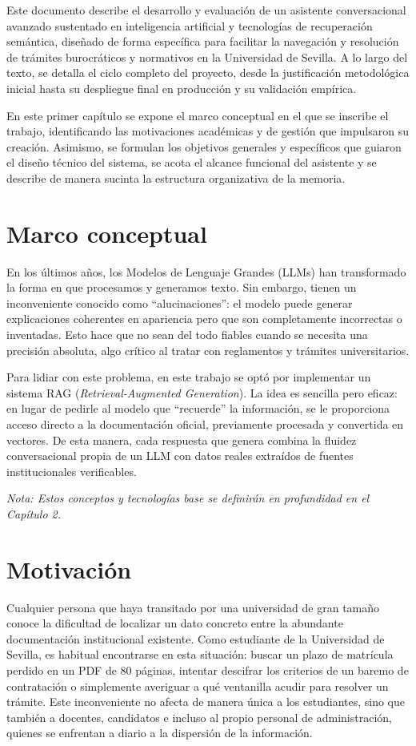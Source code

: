 \documentclass[12pt,a4paper,oneside]{report}
\begin{document}
Este documento describe el desarrollo y evaluación de un asistente conversacional avanzado sustentado en inteligencia artificial y tecnologías de recuperación semántica, diseñado de forma específica para facilitar la navegación y resolución de trámites burocráticos y normativos en la Universidad de Sevilla. A lo largo del texto, se detalla el ciclo completo del proyecto, desde la justificación metodológica inicial hasta su despliegue final en producción y su validación empírica.

En este primer capítulo se expone el marco conceptual en el que se inscribe el trabajo, identificando las motivaciones académicas y de gestión que impulsaron su creación. Asimismo, se formulan los objetivos generales y específicos que guiaron el diseño técnico del sistema, se acota el alcance funcional del asistente y se describe de manera sucinta la estructura organizativa de la memoria.

\section{Marco conceptual}

En los últimos años, los Modelos de Lenguaje Grandes (LLMs) han transformado la forma en que procesamos y generamos texto. Sin embargo, tienen un inconveniente conocido como ``alucinaciones'': el modelo puede generar explicaciones coherentes en apariencia pero que son completamente incorrectas o inventadas. Esto hace que no sean del todo fiables cuando se necesita una precisión absoluta, algo crítico al tratar con reglamentos y trámites universitarios.

Para lidiar con este problema, en este trabajo se optó por implementar un sistema RAG (\textit{Retrieval-Augmented Generation}). La idea es sencilla pero eficaz: en lugar de pedirle al modelo que ``recuerde'' la información, se le proporciona acceso directo a la documentación oficial, previamente procesada y convertida en vectores. De esta manera, cada respuesta que genera combina la fluidez conversacional propia de un LLM con datos reales extraídos de fuentes institucionales verificables.

\textit{Nota: Estos conceptos y tecnologías base se definirán en profundidad en el Capítulo 2.}

\section{Motivación}

Cualquier persona que haya transitado por una universidad de gran tamaño conoce la dificultad de localizar un dato concreto entre la abundante documentación institucional existente. Como estudiante de la Universidad de Sevilla, es habitual encontrarse en esta situación: buscar un plazo de matrícula perdido en un PDF de 80 páginas, intentar descifrar los criterios de un baremo de contratación o simplemente averiguar a qué ventanilla acudir para resolver un trámite. Este inconveniente no afecta de manera única a los estudiantes, sino que también a docentes, candidatos e incluso al propio personal de administración, quienes se enfrentan a diario a la dispersión de la información.
\end{document}
